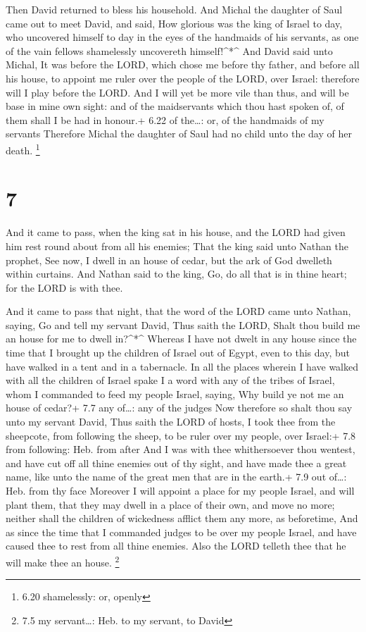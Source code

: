  Then David returned to bless his household. And Michal the
daughter of Saul came out to meet David, and said, How glorious was the
king of Israel to day, who uncovered himself to day in the eyes of the
handmaids of his servants, as one of the vain fellows shamelessly
uncovereth himself!\^{}*\^{}  And David said unto Michal,
It was before the LORD, which chose me before thy father, and before all
his house, to appoint me ruler over the people of the LORD, over Israel:
therefore will I play before the LORD.  And I will yet be
more vile than thus, and will be base in mine own sight: and of the
maidservants which thou hast spoken of, of them shall I be had in
honour.+ 6.22 of the\ldots: or, of the handmaids of my servants
 Therefore Michal the daughter of Saul had no child unto
the day of her death. \footnote{6.20 shamelessly: or, openly}

\hypertarget{section-6}{%
\section{7}\label{section-6}}

 And it came to pass, when the king sat in his house, and
the LORD had given him rest round about from all his enemies;
 That the king said unto Nathan the prophet, See now, I
dwell in an house of cedar, but the ark of God dwelleth within curtains.
 And Nathan said to the king, Go, do all that is in thine
heart; for the LORD is with thee.

 And it came to pass that night, that the word of the LORD
came unto Nathan, saying,  Go and tell my servant David,
Thus saith the LORD, Shalt thou build me an house for me to dwell
in?\^{}*\^{}  Whereas I have not dwelt in any house since
the time that I brought up the children of Israel out of Egypt, even to
this day, but have walked in a tent and in a tabernacle.  In
all the places wherein I have walked with all the children of Israel
spake I a word with any of the tribes of Israel, whom I commanded to
feed my people Israel, saying, Why build ye not me an house of cedar?+
7.7 any of\ldots: any of the judges  Now therefore so shalt
thou say unto my servant David, Thus saith the LORD of hosts, I took
thee from the sheepcote, from following the sheep, to be ruler over my
people, over Israel:+ 7.8 from following: Heb. from after 
And I was with thee whithersoever thou wentest, and have cut off all
thine enemies out of thy sight, and have made thee a great name, like
unto the name of the great men that are in the earth.+ 7.9 out of\ldots:
Heb. from thy face  Moreover I will appoint a place for my
people Israel, and will plant them, that they may dwell in a place of
their own, and move no more; neither shall the children of wickedness
afflict them any more, as beforetime,  And as since the
time that I commanded judges to be over my people Israel, and have
caused thee to rest from all thine enemies. Also the LORD telleth thee
that he will make thee an house. \footnote{7.5 my servant\ldots: Heb. to
  my servant, to David}

